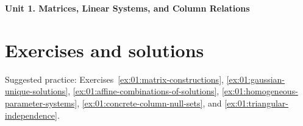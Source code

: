\documentclass[12pt]{article}
\begin{document}
{\Large\bfseries Unit 1. Matrices, Linear Systems, and Column Relations}\par

\clearpage
\section*{Exercises and solutions}
Suggested practice: Exercises~\ref{ex:01:matrix-constructions},
\ref{ex:01:gaussian-unique-solutions},
\ref{ex:01:affine-combinations-of-solutions},
\ref{ex:01:homogeneous-parameter-systems},
\ref{ex:01:concrete-column-null-sets}, and
\ref{ex:01:triangular-independence}.

\end{document}
